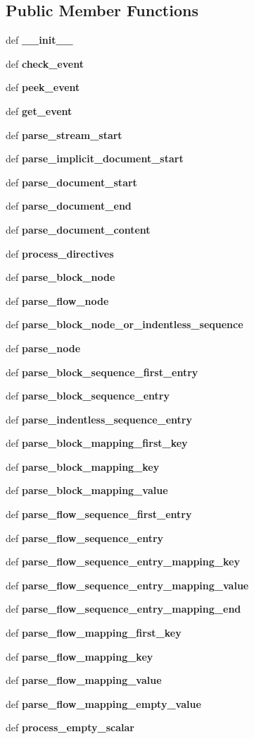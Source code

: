 \subsection*{Public Member Functions}
\begin{CompactItemize}
\item 
def {\bf \_\-\_\-init\_\-\_\-}
\item 
def {\bf check\_\-event}
\item 
def {\bf peek\_\-event}
\item 
def {\bf get\_\-event}
\item 
def {\bf parse\_\-stream\_\-start}
\item 
def {\bf parse\_\-implicit\_\-document\_\-start}
\item 
def {\bf parse\_\-document\_\-start}
\item 
def {\bf parse\_\-document\_\-end}
\item 
def {\bf parse\_\-document\_\-content}
\item 
def {\bf process\_\-directives}
\item 
def {\bf parse\_\-block\_\-node}
\item 
def {\bf parse\_\-flow\_\-node}
\item 
def {\bf parse\_\-block\_\-node\_\-or\_\-indentless\_\-sequence}
\item 
def {\bf parse\_\-node}
\item 
def {\bf parse\_\-block\_\-sequence\_\-first\_\-entry}
\item 
def {\bf parse\_\-block\_\-sequence\_\-entry}
\item 
def {\bf parse\_\-indentless\_\-sequence\_\-entry}
\item 
def {\bf parse\_\-block\_\-mapping\_\-first\_\-key}
\item 
def {\bf parse\_\-block\_\-mapping\_\-key}
\item 
def {\bf parse\_\-block\_\-mapping\_\-value}
\item 
def {\bf parse\_\-flow\_\-sequence\_\-first\_\-entry}
\item 
def {\bf parse\_\-flow\_\-sequence\_\-entry}
\item 
def {\bf parse\_\-flow\_\-sequence\_\-entry\_\-mapping\_\-key}
\item 
def {\bf parse\_\-flow\_\-sequence\_\-entry\_\-mapping\_\-value}
\item 
def {\bf parse\_\-flow\_\-sequence\_\-entry\_\-mapping\_\-end}
\item 
def {\bf parse\_\-flow\_\-mapping\_\-first\_\-key}
\item 
def {\bf parse\_\-flow\_\-mapping\_\-key}
\item 
def {\bf parse\_\-flow\_\-mapping\_\-value}
\item 
def {\bf parse\_\-flow\_\-mapping\_\-empty\_\-value}
\item 
def {\bf process\_\-empty\_\-scalar}
\end{CompactItemize}
